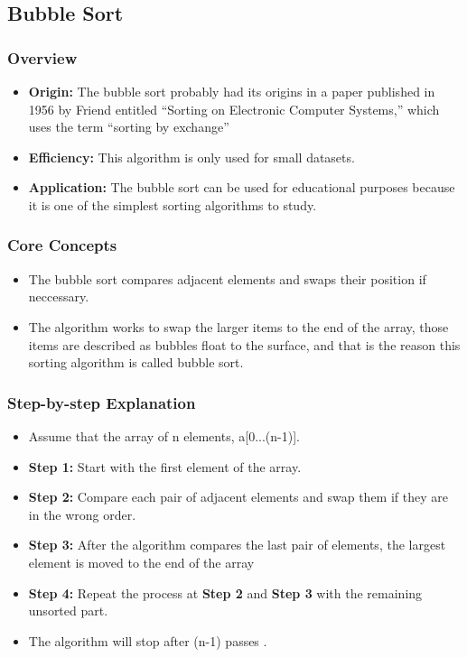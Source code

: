 \subsection[Bubble Sort]{Bubble Sort \cite{friend1956sorting}}
    \subsubsection{Overview}
        \begin{itemize}
            \item \textbf{Origin:} The bubble sort probably had its origins in a paper published in 1956 by Friend entitled “Sorting on Electronic Computer Systems,” which uses the term “sorting by exchange”
            \item \textbf{Efficiency:} This algorithm is only used for small datasets.
            \item \textbf{Application:} The bubble sort can be used for educational purposes because it is one of the simplest sorting algorithms to study.
        \end{itemize}
    \subsubsection{Core Concepts}
        \begin{itemize}
            \item The bubble sort compares adjacent elements and swaps their position if neccessary.
            \item The algorithm works to swap the larger items to the end of the array, those items are described as bubbles float to the surface, and that is the reason this sorting algorithm is called bubble sort.
        \end{itemize}
    \subsubsection{Step-by-step Explanation}
    \begin{itemize}
        \item Assume that the array of n elements, a[0...(n-1)].
        \item \textbf{Step 1:} Start with the first element of the array.
        \item \textbf{Step 2:} Compare each pair of adjacent elements and swap them if they are in the wrong order.
        \item \textbf{Step 3:} After the algorithm compares the last pair of elements, the largest element is moved to the end of the array
        \item \textbf{Step 4:} Repeat the process at \textbf{Step 2} and \textbf{Step 3} with the remaining unsorted part.
        \item The algorithm will stop after (n-1) passes .
    \end{itemize}
